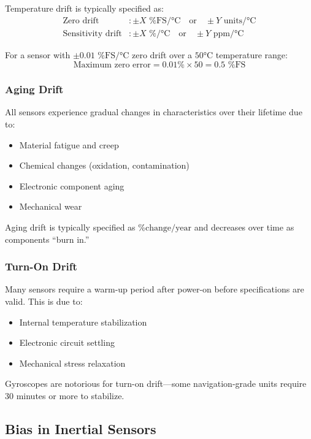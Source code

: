 Temperature drift is typically specified as:
\begin{align}
\text{Zero drift} &: \pm X\text{ \% FS}/°\text{C} \quad \text{or} \quad \pm Y\text{ units}/°\text{C} \\
\text{Sensitivity drift} &: \pm X\text{ \%}/°\text{C} \quad \text{or} \quad \pm Y\text{ ppm}/°\text{C}
\end{align}

For a sensor with $\pm 0.01\text{ \% FS}/°\text{C}$ zero drift over a $50°\text{C}$ temperature range:
\begin{equation}
\text{Maximum zero error} = 0.01\% \times 50 = 0.5\text{ \% FS}
\end{equation}

\subsubsection{Aging Drift}

All sensors experience gradual changes in characteristics over their lifetime due to:
\begin{itemize}
    \item Material fatigue and creep
    \item Chemical changes (oxidation, contamination)
    \item Electronic component aging
    \item Mechanical wear
\end{itemize}

Aging drift is typically specified as $\text{\% change}/\text{year}$ and decreases over time as components ``burn in.''

\subsubsection{Turn-On Drift}

Many sensors require a warm-up period after power-on before specifications are valid. This is due to:
\begin{itemize}
    \item Internal temperature stabilization
    \item Electronic circuit settling
    \item Mechanical stress relaxation
\end{itemize}

Gyroscopes are notorious for turn-on drift---some navigation-grade units require 30 minutes or more to stabilize.

\subsection{Bias in Inertial Sensors}

